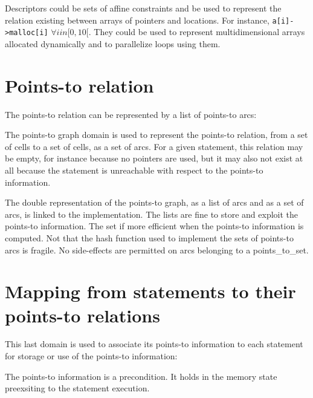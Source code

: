 \documentclass{article}
\begin{document}
Descriptors could be sets of affine constraints and be used to
represent the relation existing between arrays of pointers and
locations. For instance, \verb/a[i]->malloc[i]/ $\forall i in
[0,10[$. They could be used to represent multidimensional arrays
    allocated dynamically and to parallelize loops using them.


\section{Points-to relation}

The points-to relation can be represented by a list of points-to arcs:

{}

The points-to graph domain is used to represent the points-to
relation, from a set of cells to a set of cells, as a set of arcs. For
a given statement, this relation may be empty, for instance because no
pointers are used, but it may also not exist at all because the
statement is unreachable with respect to the points-to information.

{}

The double representation of the points-to graph, as a list of arcs
and as a set of arcs, is linked to the implementation. The lists are
fine to store and exploit the points-to information. The set if more
efficient when the points-to information is computed. Not that the
hash function used to implement the sets of points-to arcs is
fragile. No side-effects are permitted on arcs belonging to a
points\_to\_set.

\section{Mapping from statements to their points-to relations}

This last domain is used to associate its points-to information to
each statement for storage or use of the points-to information:

{}

The points-to information is a precondition. It holds in the memory
state preexsiting to the statement execution.
\end{document}
